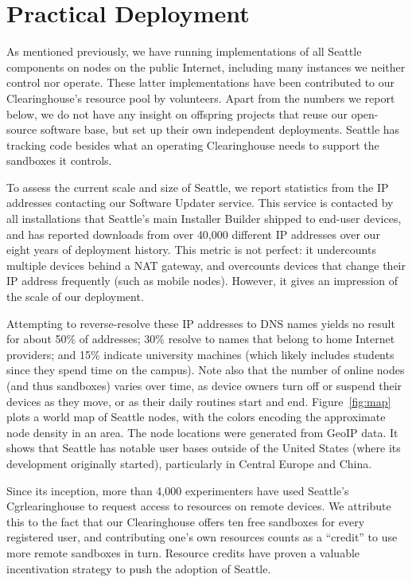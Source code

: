 \section{Practical Deployment}\label{sec-deployment}

As mentioned previously, we have running implementations of all
Seattle components on nodes on the public Internet, including
many instances we neither control nor operate. These latter
implementations have been
contributed to our Clearinghouse's resource pool by volunteers.
Apart from the numbers we report below, we do not have any
insight on offspring projects that reuse our open-source software
base, but set up their own independent deployments.
Seattle has tracking code besides what an operating Clearinghouse
needs to support the sandboxes it controls.

To assess the current scale and size of Seattle, we report
statistics from the \gls{IP} addresses contacting our Software
Updater service. This service is contacted
by all installations that Seattle's main Installer Builder shipped
to end-user devices, and has reported downloads from over 40,000
different \gls{IP} addresses over our eight years of deployment history.
This metric is not perfect: it undercounts multiple devices behind
a \gls{NAT} gateway, and overcounts devices that change their
\gls{IP} address frequently (such as mobile nodes). However, it
gives an impression of the scale of our deployment.

Attempting to reverse-resolve these \gls{IP} addresses to \gls{DNS}
names yields no result for about 50\% of addresses; 30\% resolve to
names that belong
to home Internet providers; and 15\% indicate
university machines (which likely includes students since they
spend time on the campus). Note also that the number of online
nodes (and thus sandboxes) varies over time, as device owners
turn off or suspend their devices as they move, or as their daily
routines start and end.
Figure~\ref{fig:map} plots a world map of Seattle nodes, with the
colors encoding the approximate node density in an area.
The node locations were generated from GeoIP data.
It shows that Seattle has notable user bases outside of the
United States (where its development originally started),
particularly in Central Europe and China.

Since its inception,
more than 4,000 experimenters have used Seattle's Cgrlearinghouse
to request access to resources on remote devices. We attribute this
to the fact that our Clearinghouse offers ten free sandboxes for
every registered user, and contributing one's own resources counts
as a ``credit'' to use more remote sandboxes in turn.
Resource credits have proven a valuable incentivation strategy
to push the adoption of Seattle.

